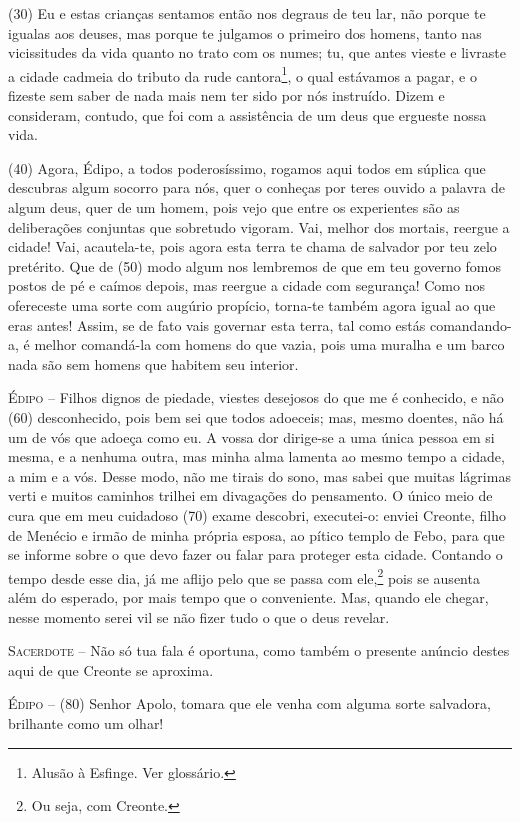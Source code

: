 (30) Eu e estas crianças sentamos então nos degraus de teu lar, não
porque te igualas aos deuses, mas porque te julgamos o primeiro dos
homens, tanto nas vicissitudes da vida quanto no trato com os numes; tu,
que antes vieste e livraste a cidade cadmeia do tributo da rude
cantora\footnote{Alusão à Esfinge. Ver glossário.}, o qual estávamos a
pagar, e o fizeste sem saber de nada mais nem ter sido por nós
instruído. Dizem e consideram, contudo, que foi com a assistência de um
deus que ergueste nossa vida.

(40) Agora, Édipo, a todos poderosíssimo, rogamos aqui todos em súplica
que descubras algum socorro para nós, quer o conheças por teres ouvido a
palavra de algum deus, quer de um homem, pois vejo que entre os
experientes são as deliberações conjuntas que sobretudo vigoram. Vai,
melhor dos mortais, reergue a cidade! Vai, acautela-te, pois agora esta
terra te chama de salvador por teu zelo pretérito. Que de (50) modo
algum nos lembremos de que em teu governo fomos postos de pé e caímos
depois, mas reergue a cidade com segurança! Como nos ofereceste uma
sorte com augúrio propício, torna-te também agora igual ao que eras
antes! Assim, se de fato vais governar esta terra, tal como estás
comandando-a, é melhor comandá-la com homens do que vazia, pois uma
muralha e um barco nada são sem homens que habitem seu interior.

\textsc{Édipo} --   Filhos dignos de piedade, viestes desejosos do que me é conhecido, e não
(60) desconhecido, pois bem sei que todos adoeceis; mas, mesmo doentes,
não há um de vós que adoeça como eu. A vossa dor dirige-se a uma única
pessoa em si mesma, e a nenhuma outra, mas minha alma lamenta ao mesmo
tempo a cidade, a mim e a vós. Desse modo, não me tirais do sono, mas
sabei que muitas lágrimas verti e muitos caminhos trilhei em divagações
do pensamento. O único meio de cura que em meu cuidadoso (70) exame
descobri, executei-o: enviei Creonte, filho de Menécio e irmão de minha
própria esposa, ao pítico templo de Febo, para que se informe sobre o
que devo fazer ou falar para proteger esta cidade. Contando o tempo
desde esse dia, já me aflijo pelo que se passa com ele,\footnote{Ou seja,
  com Creonte.} pois se ausenta além do esperado, por mais tempo que o
conveniente. Mas, quando ele chegar, nesse momento serei vil se não
fizer tudo o que o deus revelar.

\textsc{Sacerdote} --   Não só tua fala é oportuna, como também o presente anúncio destes aqui
de que Creonte se aproxima.

\textsc{Édipo} --   (80) Senhor Apolo, tomara que ele venha com alguma sorte salvadora,
brilhante como um olhar!

